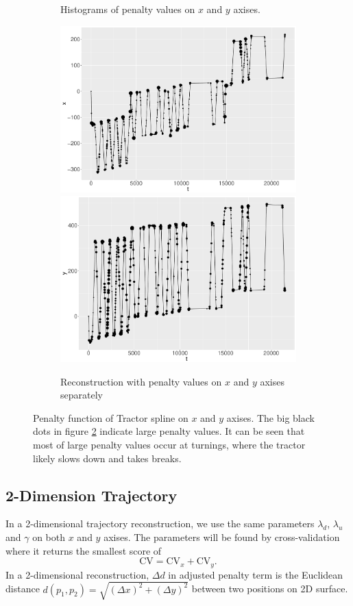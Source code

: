 \begin{figure}
\begin{subfigure}{\textwidth}
    \caption{Histograms of penalty values on $x$ and $y$ axises.}\label{penaltyxyggXYHist}
    \end{subfigure}
    \begin{subfigure}{\textwidth}
    \centering
    \includegraphics[width=0.45\linewidth]{Chapters/02TractorSplineTheory/plot/ggplot/ggRealdataXPenaltyPath.pdf}
    \includegraphics[width=0.45\linewidth]{Chapters/02TractorSplineTheory/plot/ggplot/ggRealdataYPenaltyPath.pdf}
    \caption{Reconstruction with penalty values on $x$ and $y$ axises separately}\label{penaltyxyggXYPath}
    \end{subfigure}
 \caption{Penalty function of Tractor spline on $x$ and $y$ axises. The big black dots in figure \ref{penaltyxyggXYPath} indicate large penalty values. It can be seen that most of large penalty values occur at turnings, where the tractor likely slows down and takes breaks. }\label{penaltyxygg}
 \end{figure}


\subsection{2-Dimension Trajectory}

In a 2-dimensional trajectory reconstruction, we use the same parameters $\lambda_d$, $\lambda_u$ and $\gamma$ on both $x$ and $y$ axises. The parameters will be found by cross-validation where it returns the smallest score of
\begin{equation}
\mbox{CV}=\mbox{CV}_x+\mbox{CV}_y.
\end{equation}
In a 2-dimensional reconstruction, $\Delta d$ in adjusted penalty term is the Euclidean distance $d(p_1,p_2)=\sqrt{(\Delta x)^2+(\Delta y)^2}$ between two positions on 2D surface.

